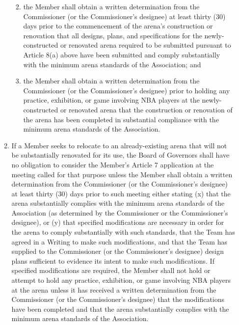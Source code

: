 \documentclass[]{book}
\providecommand{\tightlist}{%
  \setlength{\itemsep}{0pt}\setlength{\parskip}{0pt}}
\theoremstyle{definition}
\theoremstyle{definition}
\theoremstyle{definition}
\theoremstyle{remark}
\begin{document}
\begin{enumerate}
\begin{enumerate}
    \begin{enumerate}
    \def\labelenumiii{(\Alph{enumiii})}
    \tightlist
    \item
      the Member shall obtain a written determination from the
      Commissioner (or the Commissioner's designee) at least thirty (30)
      days prior to the commencement of the arena's construction or
      renovation that all designs, plans, and specifications for the
      newly-constructed or renovated arena required to be submitted
      pursuant to Article 8(a) above have been submitted and comply
      substantially with the minimum arena standards of the Association;
      and
    \item
      the Member shall obtain a written determination from the
      Commissioner (or the Commissioner's designee) prior to holding any
      practice, exhibition, or game involving NBA players at the
      newly-constructed or renovated arena that the construction or
      renovation of the arena has been completed in substantial
      compliance with the minimum arena standards of the Association.
    \end{enumerate}
  \item
    If a Member seeks to relocate to an already-existing arena that will
    not be substantially renovated for its use, the Board of Governors
    shall have no obligation to consider the Member's Article 7
    application at the meeting called for that purpose unless the Member
    shall obtain a written determination from the Commissioner (or the
    Commissioner's designee) at least thirty (30) days prior to such
    meeting either stating (x) that the arena substantially complies
    with the minimum arena standards of the Association (as determined
    by the Commissioner or the Commissioner's designee), or (y) that
    specified modifications are necessary in order for the arena to
    comply substantially with such standards, that the Team has agreed
    in a Writing to make such modifications, and that the Team has
    supplied to the Commissioner (or the Commissioner's designee) design
    plans sufficient to evidence its intent to make such modifications.
    If specified modifications are required, the Member shall not hold
    or attempt to hold any practice, exhibition, or game involving NBA
    players at the arena unless it has received a written determination
    from the Commissioner (or the Commissioner's designee) that the
    modifications have been completed and that the arena substantially
    complies with the minimum arena standards of the Association.

\end{enumerate}
\end{enumerate}
\end{document}
